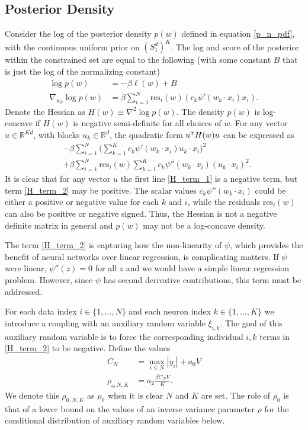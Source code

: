 \documentclass{article}
\numberwithin{equation}{section}
\theoremstyle{Lemma}
\theoremstyle{Corollary}
\theoremstyle{Theorem}
\theoremstyle{Remark}
\begin{document}
\subsection{Posterior Density}
Consider the log of the posterior density $p(w)$ defined in equation \eqref{p_n_pdf}, with the continuous uniform prior on $(S^{d}_{1})^{K}$. The log and score of the posterior within the constrained set are equal to the following (with some constant $B$ that is just the log of the normalizing constant)
\begin{align}
    \log p(w)&= -\beta \ell(w)+B\\
    \nabla_{w_{k}} \log p(w)&= \beta\sum_{i=1}^{N}\text{res}_{i}(w)(c_{k}\psi'(w_{k}\cdot x_{i})x_{i}).
\end{align}
Denote the Hessian as $H(w)\equiv \nabla^{2} \log p(w)$. The density $p(w)$ is log-concave if $H(w)$ is negative semi-definite for all choices of $w$. For any vector $u \in \mathbb{R}^{Kd}$, with blocks $u_{k} \in \mathbb{R}^{d}$, the quadratic form $u^{\text{\tiny{T}}}H(w)u$ can be expressed as
\begin{align}
    &-\beta\sum_{i=1}^{N}\Big(\sum_{k=1}^{K} c_{k}\psi'(w_{k}\cdot x_{i})u_{k}\cdot x_{i}\Big)^{2} \label{H_term_1}\\
    &+\beta\sum_{i=1}^{N}\text{res}_{i}(w)\sum_{k=1}^{K}c_{k}\psi''(w_{k} \cdot x_{i})(u_{k}\cdot x_{i})^{2}\label{H_term_2}.
\end{align}
 It is clear that for any vector $u$  the first line \eqref{H_term_1} is a negative term, but term \eqref{H_term_2} may be positive. The scalar values $c_{k}\psi''(w_{k} \cdot x_{i})$ could be either a positive or negative value for each $k$ and $i$, while the residuals $\text{res}_{i}(w)$ can also be positive or negative signed. Thus, the Hessian is not a negative definite matrix in general and $p(w)$ may not be a log-concave density. 

The term \eqref{H_term_2} is capturing how the non-linearity of $\psi$, which provides the benefit of neural networks over linear regression, is complicating matters. If $\psi$ were linear, $\psi''(z)=0$ for all $z$ and we would have a simple linear regression problem. However, since $\psi$ has second derivative contributions, this term must be addressed.

For each data index $i \in \{1, \hdots, N\}$ and each neuron index $ k \in \{1, \hdots,K\}$ we introduce a coupling with an auxiliary random variable $\xi_{i,k}$. The goal of this auxiliary random variable is to force the corresponding individual $i,k$ terms in \eqref{H_term_2} to be negative. Define the values 
\begin{align}
C_{N} &= \max_{i \leq N} |y_{i}|+a_{0}V\\
\rho_{_0,N,K}&= a_{2}\frac{\beta C_{N} V}{K}.\label{rho_def_no_delta}
\end{align}
We denote this $\rho_{0,N,K}$ as $\rho_0$ when it is clear $N$ and $K$ are set.  The role of $\rho_0$ is that of a lower bound on the values of an inverse variance parameter $\rho$ for the conditional distribution of auxiliary random variables below.
\end{document}
